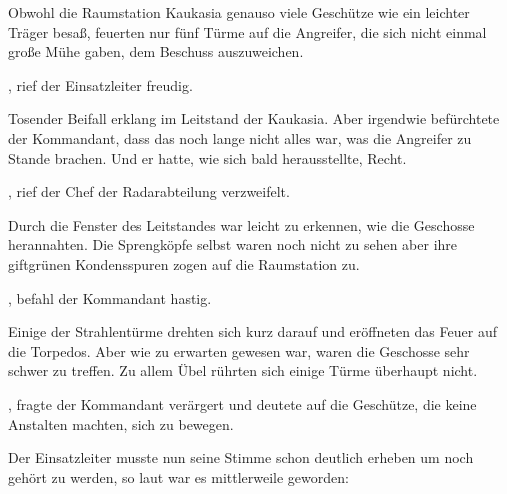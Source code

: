 \par

Obwohl die Raumstation Kaukasia genauso viele Geschütze wie ein leichter Träger besaß, feuerten nur fünf Türme auf die Angreifer, die sich nicht einmal große Mühe gaben, dem Beschuss auszuweichen.

\par

, rief der Einsatzleiter freudig. 

\par

Tosender Beifall erklang im Leitstand der Kaukasia. Aber irgendwie befürchtete der Kommandant, dass das noch lange nicht alles war, was die Angreifer zu Stande brachen. Und er hatte, wie sich bald herausstellte, Recht.

\par

, rief der Chef der Radarabteilung verzweifelt. 

\par

Durch die Fenster des Leitstandes war leicht zu erkennen, wie die Geschosse herannahten. Die Sprengköpfe selbst waren noch nicht zu sehen aber ihre giftgrünen Kondensspuren zogen auf die Raumstation zu.

\par

, befahl der Kommandant hastig. 

\par

Einige der Strahlentürme drehten sich kurz darauf und eröffneten das Feuer auf die Torpedos. Aber wie zu erwarten gewesen war, waren die Geschosse sehr schwer zu treffen. Zu allem Übel rührten sich einige Türme überhaupt nicht.

\par

, fragte der Kommandant verärgert und deutete auf die Geschütze, die keine Anstalten machten, sich zu bewegen.

\par

Der Einsatzleiter musste nun seine Stimme schon deutlich erheben um noch gehört zu werden, so laut war es mittlerweile geworden: 

